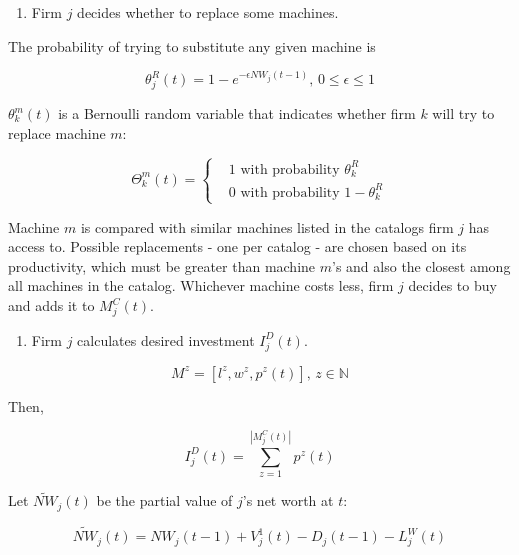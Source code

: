 \documentclass[11pt,]{article}
\providecommand{\tightlist}{%
\setlength{\itemsep}{0pt}\setlength{\parskip}{0pt}}
\begin{document}
\begin{enumerate}
\def\labelenumi{\alph{enumi}.}
\tightlist
\item
  Firm \(j\) decides whether to replace some machines.
\end{enumerate}

The probability of trying to substitute any given machine is

\begin{equation}
  \theta^R_j(t) = 1 - e^{-\epsilon NW_j(t-1)} \text{, } 0 \leq \epsilon \leq 1
\end{equation}

\(\theta_k^{m}(t)\) is a Bernoulli random variable that indicates
whether firm \(k\) will try to replace machine \(m\):

\begin{equation}
  \Theta_k^{m}(t) = 
  \begin{cases}
    & 1 \text{ with probability } \theta_k^R \\
    & 0 \text{ with probability } 1 - \theta_k^R
  \end{cases}
\end{equation}

Machine \(m\) is compared with similar machines listed in the catalogs
firm \(j\) has access to. Possible replacements - one per catalog - are
chosen based on its productivity, which must be greater than machine
\(m\)'s and also the closest among all machines in the catalog.
Whichever machine costs less, firm \(j\) decides to buy and adds it to
\(M_j^C(t)\).

\begin{enumerate}
\def\labelenumi{\alph{enumi}.}
\setcounter{enumi}{1}
\tightlist
\item
  Firm \(j\) calculates desired investment \(I_j^D(t)\).
\end{enumerate}

\begin{equation}
  M^z = [l^z, w^z, p^z(t)] \text{, } z \in \mathbb{N}
\end{equation}

Then,

\begin{equation}
  I_j^D(t) = \sum_{z = 1}^{|M^C_j(t)|} p^z(t)
\end{equation}

Let \(\widetilde{NW}_j(t)\) be the partial value of \(j\)'s net worth at
\(t\):

\begin{equation}
\widetilde{NW}_j(t) = NW_j(t-1) + V^1_j(t) - D_j(t-1) - L^W_j(t)
\end{equation}
\end{document}
